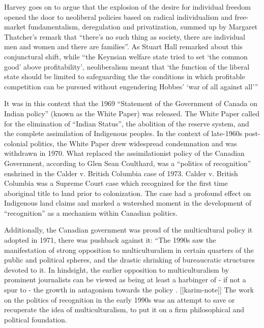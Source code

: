 \documentclass[12pt,oneside]{memoir}
\begin{document}
Harvey goes on to argue that the explosion of the desire for individual freedom opened the door to neoliberal policies based on radical individualism and free-market fundamentalism, deregulation and privatization, summed up by Margaret Thatcher's remark that ``there's no such thing as society, there are individual men and women and there are families''. As Stuart Hall remarked about this conjunctural shift, while ``the Keynsian welfare state tried to set `the common good' above profitability', neoliberalism meant that `the function of the liberal state should be limited to safeguarding the the conditions in which profitable competition can be pursued without engendering Hobbes' `war of all against all''' \citep[707]{hall-2011}

It was in this context that the 1969 ``Statement of the Government of Canada on Indian policy'' (known as the White Paper) was released. The White Paper called for the elimination of ``Indian Status'', the abolition of the reserve system, and the complete assimilation of Indigenous peoples. In the context of late-1960s post-colonial politics, the White Paper drew widespread condemnation and was withdrawn in 1970. What replaced the assimilationist policy of the Canadian Government, according to Glen Sean Coulthard, was a ``politics of recognition'' enshrined in the Calder v. British Columbia case of 1973. Calder v. British Columbia was a Supreme Court case which recognized for the first time aboriginal title to land prior to colonization. The case had a profound effect on Indigenous land claims and marked a watershed moment in the development of ``recognition'' as a mechanism within Canadian politics. 

Additionally, the Canadian government was proud of the multicultural policy it adopted in 1971, there was pushback against it: ``The 1990s saw the manifestation of strong opposition to multiculturalism in certain quarters of the public and political spheres, and the drastic shrinking of bureaucratic structures devoted to it. In hindsight, the earlier opposition to multiculturalism by prominent journalists can be viewed as being at least a harbinger of - if not a spur to - the growth in antagonism towards the policy \citep[440]{karim2002}. [[karim-note]] The work on the politics of recognition in the early 1990s was an attempt to save or recuperate the idea of multiculturalism, to put it on a firm philosophical and political foundation.
\end{document}
